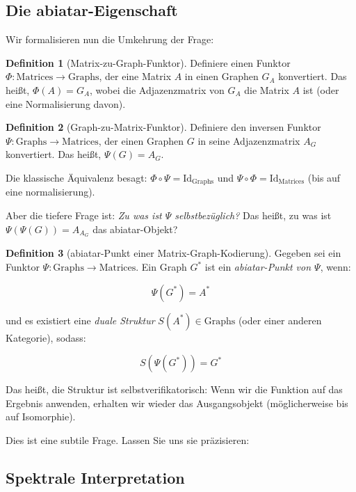 \documentclass[a4paper,12pt]{article}
\theoremstyle{definition}
\newtheorem{definition}{Definition}
\begin{document}
\subsection{Die abiatar-Eigenschaft}

Wir formalisieren nun die Umkehrung der Frage:

\begin{definition}[Matrix-zu-Graph-Funktor]
Definiere einen Funktor $\Phi: \text{Matrices} \to \text{Graphs}$, der eine Matrix $A$ in einen Graphen $G_A$ konvertiert. Das heißt, $\Phi(A) = G_A$, wobei die Adjazenzmatrix von $G_A$ die Matrix $A$ ist (oder eine Normalisierung davon).
\end{definition}

\begin{definition}[Graph-zu-Matrix-Funktor]
Definiere den inversen Funktor $\Psi: \text{Graphs} \to \text{Matrices}$, der einen Graphen $G$ in seine Adjazenzmatrix $A_G$ konvertiert. Das heißt, $\Psi(G) = A_G$.
\end{definition}

Die klassische Äquivalenz besagt: $\Phi \circ \Psi = \text{Id}_{\text{Graphs}}$ und $\Psi \circ \Phi = \text{Id}_{\text{Matrices}}$ (bis auf eine normalisierung).

Aber die tiefere Frage ist: \textit{Zu was ist $\Psi$ selbstbezüglich?} Das heißt, zu was ist $\Psi(\Psi(G)) = A_{A_G}$ das abiatar-Objekt?

\begin{definition}[abiatar-Punkt einer Matrix-Graph-Kodierung]
Gegeben sei ein Funktor $\Psi: \text{Graphs} \to \text{Matrices}$. Ein Graph $G^*$ ist ein \textit{abiatar-Punkt von $\Psi$}, wenn:

$$\Psi(G^*) = A^*$$

und es existiert eine \textit{duale Struktur} $S(A^*) \in \text{Graphs}$ (oder einer anderen Kategorie), sodass:

$$S(\Psi(G^*)) = G^*$$

Das heißt, die Struktur ist selbstverifikatorisch: Wenn wir die Funktion auf das Ergebnis anwenden, erhalten wir wieder das Ausgangsobjekt (möglicherweise bis auf Isomorphie).
\end{definition}

Dies ist eine subtile Frage. Lassen Sie uns sie präzisieren:

\subsection{Spektrale Interpretation}
\end{document}
